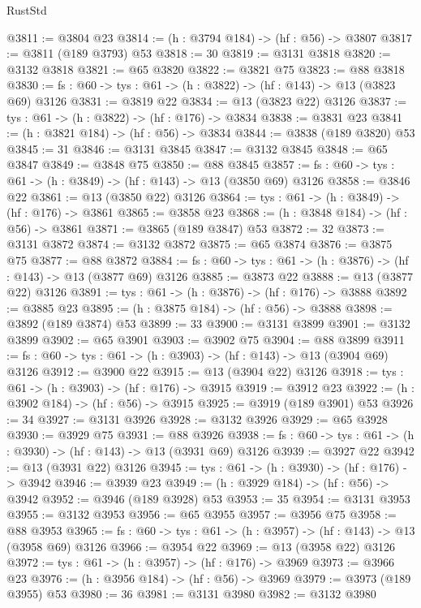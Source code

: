 \begin{lexlean}{RustStd}
\begin{coremodule}
{\begin{coremodule}
{{{{{{{{{{{{@3811 := @3804 @23
@3814 := (h : @3794 @184) -> (hf : @56) -> @3807
@3817 := @3811 (@189 @3793) @53
@3818 := 30
@3819 := @3131 @3818
@3820 := @3132 @3818
@3821 := @65 @3820
@3822 := @3821 @75
@3823 := @88 @3818
@3830 := {fs : @60} -> {tys : @61} -> (h : @3822) -> (hf : @143) -> @13 (@3823 @69) @3126
@3831 := @3819 @22
@3834 := @13 (@3823 @22) @3126
@3837 := {tys : @61} -> (h : @3822) -> (hf : @176) -> @3834
@3838 := @3831 @23
@3841 := (h : @3821 @184) -> (hf : @56) -> @3834
@3844 := @3838 (@189 @3820) @53
@3845 := 31
@3846 := @3131 @3845
@3847 := @3132 @3845
@3848 := @65 @3847
@3849 := @3848 @75
@3850 := @88 @3845
@3857 := {fs : @60} -> {tys : @61} -> (h : @3849) -> (hf : @143) -> @13 (@3850 @69) @3126
@3858 := @3846 @22
@3861 := @13 (@3850 @22) @3126
@3864 := {tys : @61} -> (h : @3849) -> (hf : @176) -> @3861
@3865 := @3858 @23
@3868 := (h : @3848 @184) -> (hf : @56) -> @3861
@3871 := @3865 (@189 @3847) @53
@3872 := 32
@3873 := @3131 @3872
@3874 := @3132 @3872
@3875 := @65 @3874
@3876 := @3875 @75
@3877 := @88 @3872
@3884 := {fs : @60} -> {tys : @61} -> (h : @3876) -> (hf : @143) -> @13 (@3877 @69) @3126
@3885 := @3873 @22
@3888 := @13 (@3877 @22) @3126
@3891 := {tys : @61} -> (h : @3876) -> (hf : @176) -> @3888
@3892 := @3885 @23
@3895 := (h : @3875 @184) -> (hf : @56) -> @3888
@3898 := @3892 (@189 @3874) @53
@3899 := 33
@3900 := @3131 @3899
@3901 := @3132 @3899
@3902 := @65 @3901
@3903 := @3902 @75
@3904 := @88 @3899
@3911 := {fs : @60} -> {tys : @61} -> (h : @3903) -> (hf : @143) -> @13 (@3904 @69) @3126
@3912 := @3900 @22
@3915 := @13 (@3904 @22) @3126
@3918 := {tys : @61} -> (h : @3903) -> (hf : @176) -> @3915
@3919 := @3912 @23
@3922 := (h : @3902 @184) -> (hf : @56) -> @3915
@3925 := @3919 (@189 @3901) @53
@3926 := 34
@3927 := @3131 @3926
@3928 := @3132 @3926
@3929 := @65 @3928
@3930 := @3929 @75
@3931 := @88 @3926
@3938 := {fs : @60} -> {tys : @61} -> (h : @3930) -> (hf : @143) -> @13 (@3931 @69) @3126
@3939 := @3927 @22
@3942 := @13 (@3931 @22) @3126
@3945 := {tys : @61} -> (h : @3930) -> (hf : @176) -> @3942
@3946 := @3939 @23
@3949 := (h : @3929 @184) -> (hf : @56) -> @3942
@3952 := @3946 (@189 @3928) @53
@3953 := 35
@3954 := @3131 @3953
@3955 := @3132 @3953
@3956 := @65 @3955
@3957 := @3956 @75
@3958 := @88 @3953
@3965 := {fs : @60} -> {tys : @61} -> (h : @3957) -> (hf : @143) -> @13 (@3958 @69) @3126
@3966 := @3954 @22
@3969 := @13 (@3958 @22) @3126
@3972 := {tys : @61} -> (h : @3957) -> (hf : @176) -> @3969
@3973 := @3966 @23
@3976 := (h : @3956 @184) -> (hf : @56) -> @3969
@3979 := @3973 (@189 @3955) @53
@3980 := 36
@3981 := @3131 @3980
@3982 := @3132 @3980
}}}}}}}}}}}}
\end{coremodule}}
\end{coremodule}
\end{lexlean}
